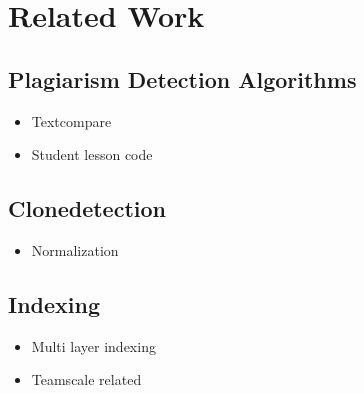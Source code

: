 
\chapter{Related Work}\label{chapter:related_work}
\section{Plagiarism Detection Algorithms}
\begin{itemize}
    \item Textcompare
    \item Student lesson code
\end{itemize}
\section{Clonedetection}
\begin{itemize}
    \item Normalization
\end{itemize}
\section{Indexing}
\begin{itemize}
    \item Multi layer indexing
    \item Teamscale related
\end{itemize}
